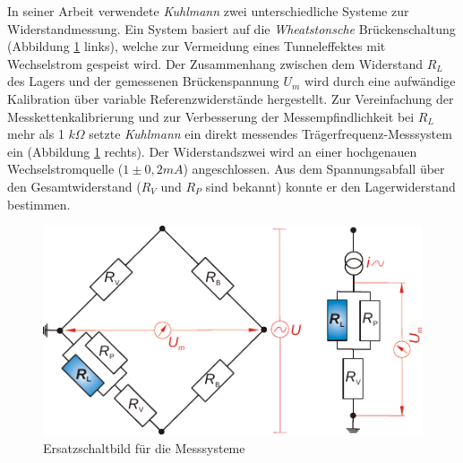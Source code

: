 In seiner Arbeit \cite{kuhlmann_2009} verwendete \textit{Kuhlmann} zwei unterschiedliche Systeme zur Widerstandmessung.
Ein System basiert auf die \textit{Wheatstonsche} Brückenschaltung (Abbildung \ref{fig:ersatzschaltbild_messsysteme_kuhlmann} links), welche zur Vermeidung eines Tunneleffektes mit Wechselstrom gespeist wird.
Der Zusammenhang zwischen dem Widerstand $R_L$ des Lagers und der gemessenen Brückenspannung $U_m$ wird durch eine aufwändige Kalibration über variable Referenzwiderstände hergestellt.
Zur Vereinfachung der Messkettenkalibrierung und zur Verbesserung der Messempfindlichkeit bei $R_L$ mehr als 1 $k\Omega$ setzte \textit{Kuhlmann} ein direkt messendes Trägerfrequenz-Messsystem ein (Abbildung \ref{fig:ersatzschaltbild_messsysteme_kuhlmann} rechts).
Der Widerstandszwei wird an einer hochgenauen Wechselstromquelle ($1 \pm 0,2 mA$) angeschlossen.
Aus dem Spannungsabfall über den Gesamtwiderstand ($R_V$ und $R_P$ sind bekannt) konnte er den Lagerwiderstand bestimmen.
\begin{figure}[htb]
    \centering
    \includegraphics[]{./images/ersatzschaltbild_kuhlmann.pdf}
    \caption{Ersatzschaltbild für die Messsysteme \cite{kuhlmann_2009}}
    \label{fig:ersatzschaltbild_messsysteme_kuhlmann}
\end{figure}
%

